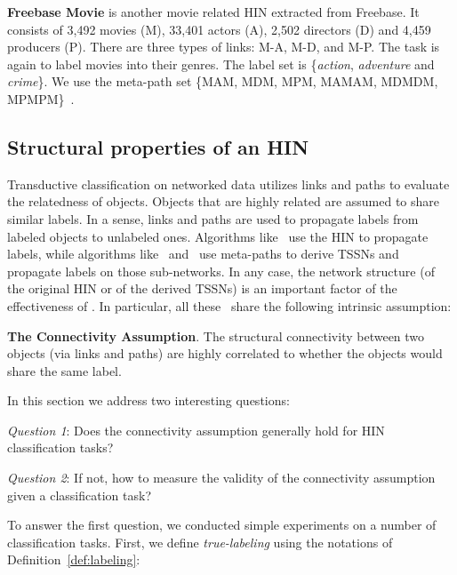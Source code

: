 
\textbf{Freebase Movie} is another movie related HIN extracted from Freebase. 
It consists of 3,492 movies (M), 33,401 actors (A), 2,502 directors (D) and 4,459 producers (P). 
There are three types of links: M-A, M-D, and M-P.
The task is again to label movies into their genres. 
The label set is \{\emph{action}, \emph{adventure} and \emph{crime}\}.
We use the meta-path set \{MAM, MDM, MPM, MAMAM, MDMDM, MPMPM\}~\cite{DBLP:dblp_conf/cikm/WanLKYGCH15}.

\subsection{Structural properties of an HIN}

Transductive classification on networked data utilizes links and paths to evaluate the relatedness of objects.
Objects that are highly related are assumed to share similar labels. 
In a sense, links and paths are used to
propagate labels from labeled objects
to unlabeled ones. 
Algorithms like \gnm\ use the HIN to propagate labels, while algorithms like \hpm\ and \gm\ use
meta-paths to derive TSSNs and propagate labels on those sub-networks. 
In any case, the network structure (of the original HIN or of the derived TSSNs) is
an important factor of the effectiveness of \tcrs.
In particular, 
all these \tcrs\ share the following intrinsic assumption:
\begin{assumption}
{\bf The Connectivity Assumption}.
The structural connectivity between two objects (via links and paths) 
are highly correlated to whether the objects would share the same label. 
\end{assumption}
In this section we address two interesting questions:

{\it Question 1}:
Does the connectivity assumption generally hold for HIN classification tasks?

{\it Question 2}:
If not, how to measure the validity of the connectivity assumption given a classification task?


To answer the first question, we conducted simple experiments on a number of classification tasks.
First, we define {\it true-labeling} using the notations of Definition~\ref{def:labeling}:

